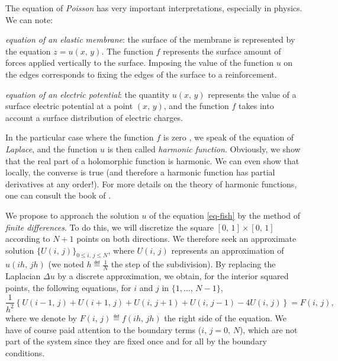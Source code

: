 
The equation of \textit{Poisson} has very important interpretations, especially in physics. We can note: \begin{rs}
\item {} \textit{equation of an elastic membrane}: the surface of the membrane is represented by the equation $ z = u (x, \, y) $. The function $ f $ represents the surface amount of forces applied vertically to the surface. Imposing the value of the function $ u $ on the edges corresponds to fixing the edges of the surface to a reinforcement.
\item {} \textit{equation of an electric potential}: the quantity $ u (x, \, y) $ represents the value of a surface electric potential at a point $ (x, \, y ) $, and the function $ f $ takes into account a surface distribution of electric charges.
\end{rs}     In the particular case where the function $ f $ is zero , we speak of the equation of \textit{Laplace}, and the function $ u $ is then called \textit{harmonic function}. Obviously, we show that the real part of a holomorphic function is harmonic. We can even show that locally, the converse is true (and therefore a harmonic function has partial derivatives at any order!). For more details on the theory of harmonic functions, one can consult the book of  \cite [p.275]{rudin}.
 
 
We propose to approach the solution $ u $ of the equation \eqref{eq-fish} by the method of \textit{finite differences}. To do this, we will discretize the square $ [0, \, 1] \times [0, \, 1] $ according to $ N + 1 $ points on both directions. We therefore seek an approximate solution $ \{U (i, \, j) \}_{0 \leq i, \, j \leq N} $, where $ U (i, \, j) $ represents an approximation of $ u (ih, \, jh) $ (we noted $ h \eqdef \frac{1}{N} $ the step of the subdivision). By replacing the Laplacian $ \Delta u $ by a discrete approximation, we obtain, for the interior squared points, the following equations, for $ i $ and $ j $ in $ \{1, \ldots, \, N-1 \} $,
\begin{equation}
\label{eq-poisson-discretise}
\frac{1}{h^2} \left\{U (i-1, \, j) + U (i + 1, \, j) + U (i, \, j + 1) + U (i , \, j-1) - 4 U (i, \, j) \right\} = F (i, \, j),
\end{equation}
where we denote by $ F (i, \, j) \eqdef f(ih, \, jh) $ the right side of the equation. We have of course paid attention to the boundary terms ($ i, \, j = 0, \, N $), which are not part of the system since they are fixed once and for all by the boundary conditions.
 
